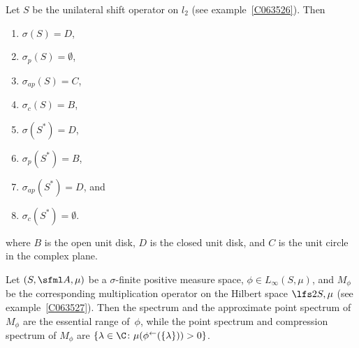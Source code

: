 \begin{exam} Let $S$ be the unilateral shift operator on $l_2$
(see example~\ref{C063526}). Then
    \begin{enumerate}[label=(\alph*)]
      \item $\sigma(S) = D$,
      \item $\sigma_p(S) = \emptyset$,
      \item $\sigma_{ap}(S) = C$,
      \item $\sigma_c(S) = B$,
      \item $\sigma(S^*) = D$,
      \item $\sigma_p(S^*) = B$,
      \item $\sigma_{ap}(S^*) = D$, and
      \item $\sigma_c(S^*) = \emptyset$.
    \end{enumerate}
where $B$ is the open unit disk, $D$ is the closed unit disk, and $C$ is the unit circle in the complex plane.
\end{exam}

\begin{exam} Let $(S,\sfml A, \mu)$ be a $\sigma$-finite positive measure space, $\phi \in L_\infty(S,\mu)$, and $M_\phi$ be the
corresponding multiplication operator on the Hilbert space $\lfs2{S,\mu}$ (see example~\ref{C063527}). Then
the spectrum and the approximate point spectrum of $M_\phi$ are the essential range of~$\phi$, while the point spectrum
and compression spectrum of $M_\phi$ are $\{\lambda \in \C\colon \mu(\phi^{\gets}(\{\lambda\})) > 0\}$.
\end{exam}






















\endinput









